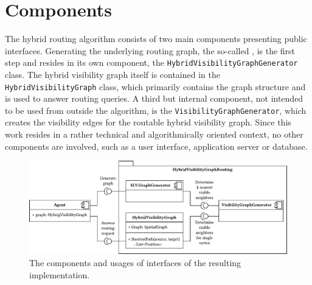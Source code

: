 \section{Components}
\label{sec:components}

	The hybrid routing algorithm consists of two main components presenting public interfaces.
	Generating the underlying routing graph, the so-called , is the first step and resides in its own component, the \texttt{HybridVisibilityGraphGenerator} class.
	The hybrid visibility graph itself is contained in the \texttt{HybridVisibilityGraph} class, which primarily contains the graph structure and is used to answer routing queries.
	A third but internal component, not intended to be used from outside the algorithm, is the \texttt{VisibilityGraphGenerator}, which creates the visibility edges for the routable hybrid visibility graph.
	Since this work resides in a rather technical and algorithmically oriented context, no other components are involved, such as a user interface, application server or database.
	
	\begin{figure}[h]
		\begin{figcenter}
			\includegraphics[scale=0.8]{images/components.pdf}
		\end{figcenter}
		\caption[Component diagram of the hybrid visibility graph implementation.]{The components and usages of interfaces of the resulting implementation.}
		\label{fig:components}
	\end{figure}
	
